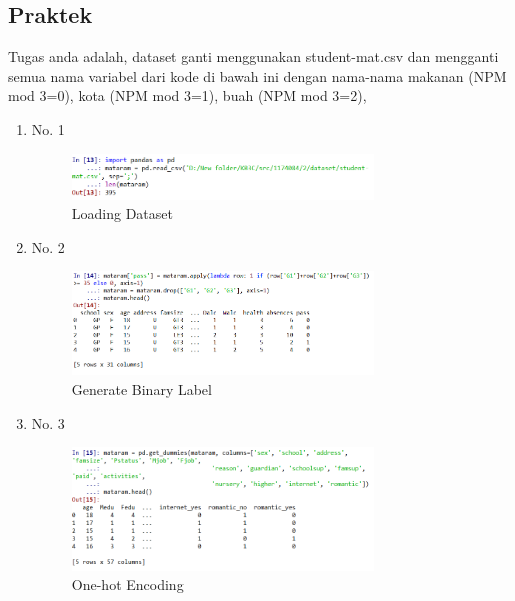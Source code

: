 \subsection{Praktek}
	Tugas anda adalah, dataset ganti menggunakan student-mat.csv dan mengganti semua nama variabel dari kode di bawah ini dengan nama-nama makanan (NPM mod 3=0), kota (NPM mod 3=1), buah (NPM mod 3=2),
 
\begin{enumerate}
\item No. 1
	\hfill\\
	
\begin{figure}[H]
    \includegraphics[width=8cm]{figures/1174084/2/praktek/1.png}
    \centering
    \caption{Loading Dataset}
\end{figure}

\item No. 2
	\hfill\\
	
\begin{figure}[H]
    \includegraphics[width=8cm]{figures/1174084/2/praktek/2.png}
    \centering
    \caption{Generate Binary Label}
\end{figure}

\item No. 3
	\hfill\\
	
\begin{figure}[H]
    \includegraphics[width=8cm]{figures/1174084/2/praktek/3.png}
    \centering
    \caption{One-hot Encoding}
\end{figure}


\end{enumerate}

